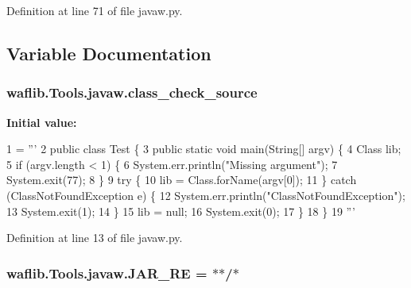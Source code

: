 Definition at line 71 of file javaw.\+py.



\subsection{Variable Documentation}
\subsubsection[{\texorpdfstring{class\+\_\+check\+\_\+source}{class_check_source}}]{ waflib.\+Tools.\+javaw.\+class\+\_\+check\+\_\+source}\hypertarget{namespacewaflib_1_1_tools_1_1javaw_aaf0c53704261cac08d5ab9f21d6d996f}{}\label{namespacewaflib_1_1_tools_1_1javaw_aaf0c53704261cac08d5ab9f21d6d996f}
{\bfseries Initial value\+:}
\begin{DoxyCode}
1 = \textcolor{stringliteral}{'''}
2 \textcolor{stringliteral}{public class Test \{}
3 \textcolor{stringliteral}{    public static void main(String[] argv) \{}
4 \textcolor{stringliteral}{        Class lib;}
5 \textcolor{stringliteral}{        if (argv.length < 1) \{}
6 \textcolor{stringliteral}{            System.err.println("Missing argument");}
7 \textcolor{stringliteral}{            System.exit(77);}
8 \textcolor{stringliteral}{        \}}
9 \textcolor{stringliteral}{        try \{}
10 \textcolor{stringliteral}{            lib = Class.forName(argv[0]);}
11 \textcolor{stringliteral}{        \} catch (ClassNotFoundException e) \{}
12 \textcolor{stringliteral}{            System.err.println("ClassNotFoundException");}
13 \textcolor{stringliteral}{            System.exit(1);}
14 \textcolor{stringliteral}{        \}}
15 \textcolor{stringliteral}{        lib = null;}
16 \textcolor{stringliteral}{        System.exit(0);}
17 \textcolor{stringliteral}{    \}}
18 \textcolor{stringliteral}{\}}
19 \textcolor{stringliteral}{'''}
\end{DoxyCode}


Definition at line 13 of file javaw.\+py.

\subsubsection[{\texorpdfstring{J\+A\+R\+\_\+\+RE}{JAR_RE}}]{ waflib.\+Tools.\+javaw.\+J\+A\+R\+\_\+\+RE = \textquotesingle{}$\ast$$\ast$/$\ast$\textquotesingle{}}\hypertarget{namespacewaflib_1_1_tools_1_1javaw_a0a409fd307f09dec0dc7def4a14d2135}{}\label{namespacewaflib_1_1_tools_1_1javaw_a0a409fd307f09dec0dc7def4a14d2135}


